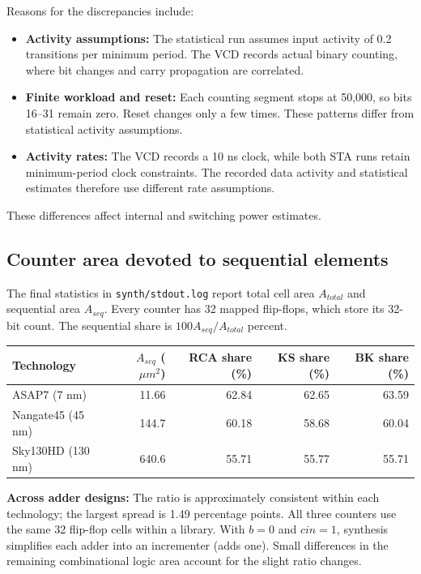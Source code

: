 \documentclass[10pt,letterpaper]{article}
\begin{document}
Reasons for the discrepancies include:
\begin{itemize}
\item \textbf{Activity assumptions:} The statistical run assumes input
activity of 0.2 transitions per minimum period. The VCD records actual
binary counting, where bit changes and carry propagation are correlated.
\item \textbf{Finite workload and reset:} Each counting segment stops at
50,000, so bits 16--31 remain zero. Reset changes only a few times. These
patterns differ from statistical activity assumptions.
\item \textbf{Activity rates:} The VCD records a 10 ns clock, while both
STA runs retain minimum-period clock constraints. The recorded data
activity and statistical estimates therefore use different rate assumptions.
\end{itemize}
These differences affect internal and switching power estimates.

\subsection{Counter area devoted to sequential elements}
The final statistics in \texttt{synth/stdout.log} report total cell area
$A_{total}$ and sequential area $A_{seq}$. Every counter has 32 mapped
flip-flops, which store its 32-bit count. The sequential share is
$100 A_{seq}/A_{total}$ percent.


\begin{center}\small
\begin{tabular}{lrrrr}
\toprule
Technology & $A_{seq}$ ($\mu m^2$) & RCA share (\%) & KS share (\%) & BK share (\%) \\
\midrule
ASAP7 (7 nm) & 11.66 & 62.84 & 62.65 & 63.59 \\
Nangate45 (45 nm) & 144.7 & 60.18 & 58.68 & 60.04 \\
Sky130HD (130 nm) & 640.6 & 55.71 & 55.77 & 55.71 \\
\bottomrule
\end{tabular}
\end{center}

\textbf{Across adder designs:} The ratio is approximately consistent within each technology; the largest spread is 1.49 percentage points. All three counters use the same 32 flip-flop cells within a library.
With $b=0$ and $cin=1$, synthesis simplifies each adder into an incrementer
(adds one). Small differences in the remaining combinational logic area
account for the slight ratio changes.
\end{document}
